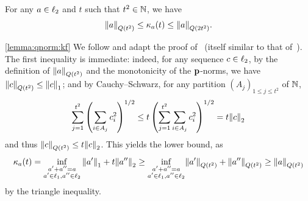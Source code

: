 \begin{lemma}\label{lemma:qnorm:kf}
  For any $a\in\lp[2]$ and $t$ such that $t^2\in\N$, we have
  \begin{equation}\label{eq:qnorm:kf}
    \norm{a}_{Q(t^2)} \leq \kf{a}(t) \leq \norm{a}_{Q(2t^2)}.
  \end{equation}
\end{lemma}
\begin{proofof}{\cref{lemma:qnorm:kf}}
  We follow and adapt the proof of~\cite[Lemma 2.2]{Astashkin:2010} (itself similar to that of~\cite[Lemma 2]{MS:90}). The first inequality is immediate: indeed, for any sequence $c\in\lp[2]$,
  by the definition of $\norm{a}_{Q(t^2)}$ and the monotonicity of the $\p$-norms, we have $\norm{c}_{Q(t^2)} \leq \normone{c}$; and by Cauchy--Schwarz, for any partition $(A_j)_{1\leq j\leq t^2}$ of $\N$,
  \[
      \sum_{j=1}^{t^2} \left( \sum_{i\in A_j} c_i^2 \right)^{1/2} 
      \leq t\left( \sum_{j=1}^{t^2} \sum_{i\in A_j} c_i^2 \right)^{1/2} = t\normtwo{c}
  \]
  and thus $\norm{c}_{Q(t^2)} \leq t\normtwo{c}$. This yields the lower bound, as
  \[
      \kf{a}(t) = \inf_{\substack{a'+a''=a\\a'\in\lp[1],a''\in\lp[2]}} \normone{a'}+t\normtwo{a''} \geq 
      \inf_{\substack{a'+a''=a\\a'\in\lp[1],a''\in\lp[2]}} \norm{a'}_{Q(t^2)}+\norm{a''}_{Q(t^2)}
      \geq \norm{a}_{Q(t^2)}
  \]
  by the triangle inequality.
  

\end{proofof}
